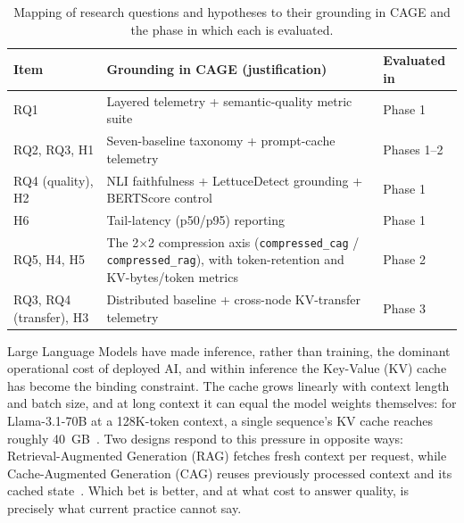 \begin{table}[H]
\centering
\setlength{\abovecaptionskip}{0pt}
\caption[Research questions and hypotheses, their grounding, and evaluating phase]{Mapping of research questions and hypotheses to their grounding in CAGE and the phase in which each is evaluated.}
\label{tab:rq_grounding}
\footnotesize
\begin{tabular}{@{}p{}p{}p{}@{}}
\toprule
\textbf{Item} & \textbf{Grounding in CAGE (justification)} & \textbf{Evaluated in} \\
\midrule
RQ1            & Layered telemetry + semantic-quality metric suite & Phase 1 \\ \addlinespace
RQ2, RQ3, H1  & Seven-baseline taxonomy + prompt-cache telemetry  & Phases 1--2 \\ \addlinespace
RQ4 (quality), H2 & NLI faithfulness + LettuceDetect grounding + BERTScore control & Phase 1 \\ \addlinespace
H6            & Tail-latency (p50/p95) reporting & Phase 1 \\ \addlinespace
RQ5, H4, H5   & The 2$\times$2 compression axis (\texttt{compressed\_cag} / \texttt{compressed\_rag}), with token-retention and KV-bytes/token metrics & Phase 2 \\ \addlinespace
RQ3, RQ4 (transfer), H3 & Distributed baseline + cross-node KV-transfer telemetry & Phase 3 \\
\bottomrule
\end{tabular}
\end{table}



Large Language Models have made inference, rather than training, the dominant
operational cost of deployed AI, and within inference the Key-Value (KV) cache has
become the binding constraint. The cache grows linearly with context length and
batch size, and at long context it can equal the model weights themselves: for
Llama-3.1-70B at a 128K-token context, a single sequence's KV cache reaches roughly
40~GB~\cite{li2024kvsurvey}. Two designs respond to this pressure in opposite ways:
Retrieval-Augmented Generation (RAG) fetches fresh context per request, while
Cache-Augmented Generation (CAG) reuses previously processed context and its cached
state~\cite{yu2024dontdorag}. Which bet is better, and at what cost to answer
quality, is precisely what current practice cannot say.

